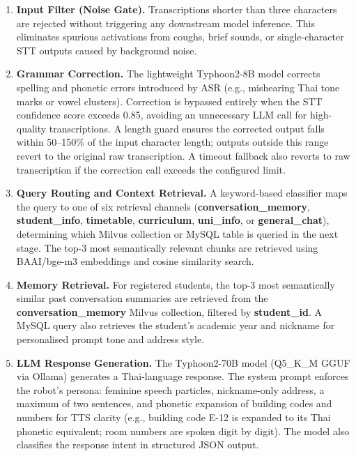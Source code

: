\begin{enumerate}
    \item \textbf{Input Filter (Noise Gate).} Transcriptions shorter than three characters are rejected without triggering any downstream model inference. This eliminates spurious activations from coughs, brief sounds, or single-character STT outputs caused by background noise.

    \item \textbf{Grammar Correction.} The lightweight Typhoon2-8B model corrects spelling and phonetic errors introduced by ASR (e.g., mishearing Thai tone marks or vowel clusters). Correction is bypassed entirely when the STT confidence score exceeds 0.85, avoiding an unnecessary LLM call for high-quality transcriptions. A length guard ensures the corrected output falls within 50--150\% of the input character length; outputs outside this range revert to the original raw transcription. A timeout fallback also reverts to raw transcription if the correction call exceeds the configured limit.

    \item \textbf{Query Routing and Context Retrieval.} A keyword-based classifier maps the query to one of six retrieval channels (\textbf{conversation\_memory}, \textbf{student\_info}, \textbf{timetable}, \textbf{curriculum}, \textbf{uni\_info}, or \textbf{general\_chat}), determining which Milvus collection or MySQL table is queried in the next stage. The top-3 most semantically relevant chunks are retrieved using BAAI/bge-m3 embeddings and cosine similarity search.

    \item \textbf{Memory Retrieval.} For registered students, the top-3 most semantically similar past conversation summaries are retrieved from the \textbf{conversation\_memory} Milvus collection, filtered by \textbf{student\_id}. A MySQL query also retrieves the student's academic year and nickname for personalised prompt tone and address style.

    \item \textbf{LLM Response Generation.} The Typhoon2-70B model (Q5\_K\_M GGUF via Ollama) generates a Thai-language response. The system prompt enforces the robot's persona: feminine speech particles, nickname-only address, a maximum of two sentences, and phonetic expansion of building codes and numbers for TTS clarity (e.g., building code E-12 is expanded to its Thai phonetic equivalent; room numbers are spoken digit by digit). The model also classifies the response intent in structured JSON output.


\end{enumerate}
